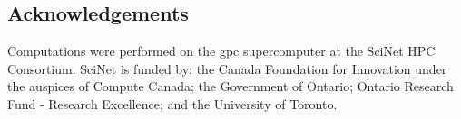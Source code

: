 \documentclass{article}\usepackage{graphicx, color}
\begin{document}
\subsection{Acknowledgements}
Computations were performed on the gpc supercomputer at the SciNet HPC
Consortium\cite{Loken2010}. SciNet is funded by: the Canada Foundation for
Innovation under the auspices of Compute Canada; the Government of Ontario;
Ontario Research Fund - Research Excellence; and the University of Toronto.



\end{document}
